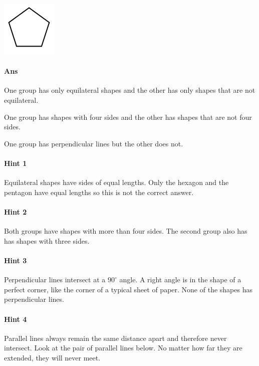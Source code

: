 \documentclass[twocolumn,10pt]{article}
\def\shrinkfactor{0.55}
\begin{document}
\includegraphics[scale=\shrinkfactor]{figures/498a6b09730fdba2360826c138eeee142e8cccc1.png}


\paragraph{Ans} 


 One group has only equilateral shapes and the other has only shapes that are not equilateral.

One group has shapes with four sides and the other has shapes that are not four sides.

One group has perpendicular lines but the other does not.



\paragraph{Hint 1}Equilateral shapes have sides of equal lengths.  Only the hexagon and the pentagon have equal lengths so this is not the correct answer.

\paragraph{Hint 2}Both groups have shapes with more than four sides.  The second group also has has shapes with three sides.

\paragraph{Hint 3}Perpendicular lines intersect at a $90 ^\circ$ angle.
A right angle is in the shape of a perfect corner, like the corner of a typical sheet of paper.  None of the shapes has perpendicular lines.

\paragraph{Hint 4}Parallel lines always remain the same distance apart and therefore never intersect.  Look at the pair of parallel lines below.  No matter how far they are extended, they will never meet.
\end{document}
